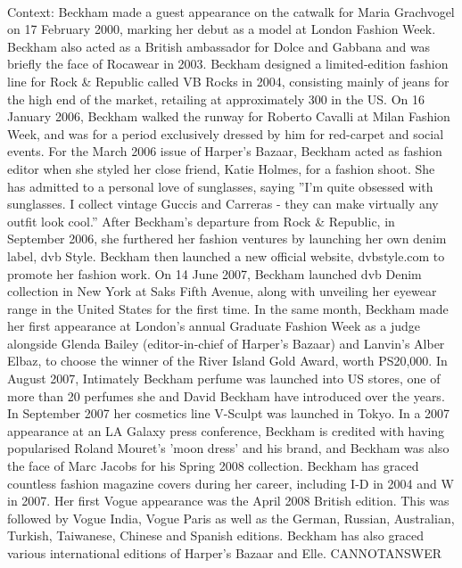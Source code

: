 \documentclass[11pt,a4paper, onecolumn]{article}
\begin{document}
\\ Context: Beckham made a guest appearance on the catwalk for Maria Grachvogel on 17 February 2000, marking her debut as a model at London Fashion Week. Beckham also acted as a British ambassador for Dolce and Gabbana and was briefly the face of Rocawear in 2003. Beckham designed a limited-edition fashion line for Rock & Republic called VB Rocks in 2004, consisting mainly of jeans for the high end of the market, retailing at approximately  300 in the US. On 16 January 2006, Beckham walked the runway for Roberto Cavalli at Milan Fashion Week, and was for a period exclusively dressed by him for red-carpet and social events. For the March 2006 issue of Harper's Bazaar, Beckham acted as fashion editor when she styled her close friend, Katie Holmes, for a fashion shoot. She has admitted to a personal love of sunglasses, saying ''I'm quite obsessed with sunglasses. I collect vintage Guccis and Carreras - they can make virtually any outfit look cool.'' After Beckham's departure from Rock & Republic, in September 2006, she furthered her fashion ventures by launching her own denim label, dvb Style. Beckham then launched a new official website, dvbstyle.com to promote her fashion work. On 14 June 2007, Beckham launched dvb Denim collection in New York at Saks Fifth Avenue, along with unveiling her eyewear range in the United States for the first time. In the same month, Beckham made her first appearance at London's annual Graduate Fashion Week as a judge alongside Glenda Bailey (editor-in-chief of Harper's Bazaar) and Lanvin's Alber Elbaz, to choose the winner of the River Island Gold Award, worth PS20,000. In August 2007, Intimately Beckham perfume was launched into US stores, one of more than 20 perfumes she and David Beckham have introduced over the years. In September 2007 her cosmetics line V-Sculpt was launched in Tokyo. In a 2007 appearance at an LA Galaxy press conference, Beckham is credited with having popularised Roland Mouret's 'moon dress' and his brand, and Beckham was also the face of Marc Jacobs for his Spring 2008 collection. Beckham has graced countless fashion magazine covers during her career, including I-D in 2004 and W in 2007. Her first Vogue appearance was the April 2008 British edition. This was followed by Vogue India, Vogue Paris as well as the German, Russian, Australian, Turkish, Taiwanese, Chinese and Spanish editions. Beckham has also graced various international editions of Harper's Bazaar and Elle. CANNOTANSWER
\end{document}
